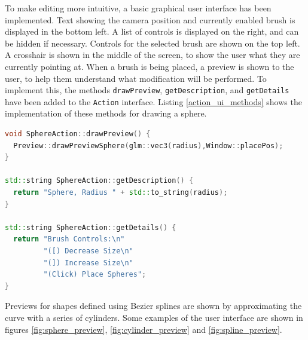 \documentclass[11pt]{article}
\begin{document}
To make editing more intuitive, a basic graphical user interface has been implemented. Text showing the camera position and currently enabled brush is displayed in the bottom left. A list of controls is displayed on the right, and can be hidden if necessary. Controls for the selected brush are shown on the top left. A crosshair is shown in the middle of the screen, to show the user what they are currently pointing at. When a brush is being placed, a preview is shown to the user, to help them understand what modification will be performed. To implement this, the methods \texttt{drawPreview}, \texttt{getDescription}, and \texttt{getDetails} have been added to the \texttt{Action} interface. Listing \ref{action_ui_methods} shows the implementation of these methods for drawing a sphere.

\begin{lstlisting}[language=C++,label={action_ui_methods},caption={The UI methods for the \texttt{SphereAction} class.}]
void SphereAction::drawPreview() {
  Preview::drawPreviewSphere(glm::vec3(radius),Window::placePos);
}

std::string SphereAction::getDescription() {
  return "Sphere, Radius " + std::to_string(radius);
}

std::string SphereAction::getDetails() {
  return "Brush Controls:\n"
         "([) Decrease Size\n"
         "(]) Increase Size\n"
         "(Click) Place Spheres";
}
\end{lstlisting}

Previews for shapes defined using Bezier splines are shown by approximating the curve with a series of cylinders. Some examples of the user interface are shown in figures \ref{fig:sphere_preview}, \ref{fig:cylinder_preview} and \ref{fig:spline_preview}.
\end{document}
